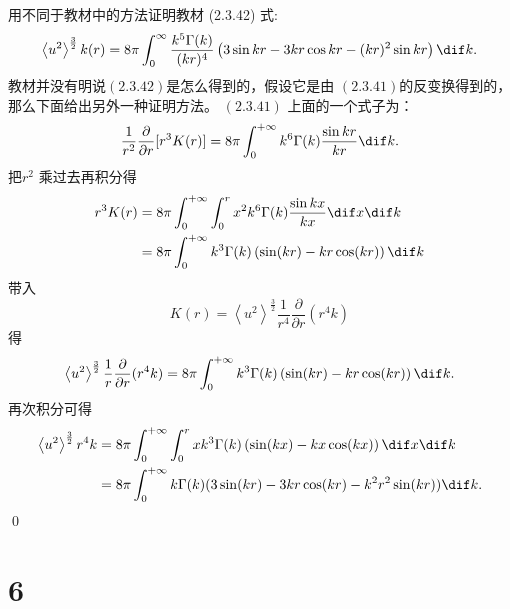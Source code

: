 \documentclass[12pt,a4]{ctexart}
\begin{document}
用不同于教材中的方法证明教材 (2.3.42) 式:
\begin{equation}
   \left\langle u^{2}\right\rangle^{\frac{3}{2}} k(r)=8 \pi \int_{0}^{\infty} \frac{k^{5} \Gamma(k)}{(k r)^{4}}\left(3 \sin k r-3 k r \cos k r-(k r)^{2} \sin k r\right)\dif k.
\end{equation}
教材并没有明说$(2.3.42)$是怎么得到的，假设它是由 $(2.3.41)$的反变换得到的，那么下面给出另外一种证明方法。 $(2.3.41)$ 上面的一个式子为：
\begin{equation}
   \frac{1}{r^2} \frac{\partial }{\partial r} [r^3 K(r)] = 8 \pi \int_{0}^{+\infty} k^6 \Gamma(k) \frac{\sin kr}{kr} \dif k.
\end{equation}
把$r^2$ 乘过去再积分得
\begin{equation}
   \begin{aligned}
	  r^3 K(r) & =  8 \pi \int_{0}^{+\infty} \int_{0}^r x^2 k^6 \Gamma(k) \frac{\sin kx}{kx} \dif x \dif k\\
			   &= 8 \pi \int_{0}^{+\infty} k^3 \Gamma(k) \left( \sin(kr) - k r \cos(kr) \right) \dif k \\
   \end{aligned}
\end{equation}
带入
\begin{equation}
   K(r) = \left\langle u^{2}\right\rangle^{\frac{3}{2}} \frac{1}{r^4} \frac{\partial }{\partial r} (r^4k) 
\end{equation}
得
\begin{equation}
   \left\langle u^{2}\right\rangle^{\frac{3}{2}} \frac{1}{r} \frac{\partial }{\partial r} (r^4k)  = 8 \pi \int_{0}^{+\infty} k^3 \Gamma(k) \left( \sin(kr) - k r \cos(kr) \right) \dif k.
\end{equation}
再次积分可得
\begin{equation}
   \begin{aligned}
	  \left\langle u^{2}\right\rangle^{\frac{3}{2}} r^4k & = 8 \pi \int_{0}^{+\infty} \int_{0}^r x k^3 \Gamma(k) \left( \sin(kx) - k x \cos(kx) \right) \dif x \dif k\\
														 &= 8 \pi \int_{0}^{+\infty}   k \Gamma(k) ( 3 \sin(kr) - 3 k r \cos(k r) - k^2 r^2 \sin(kr) )  \dif k.\\
   \end{aligned}
\end{equation}
\qed




\section{6}
\end{document}

